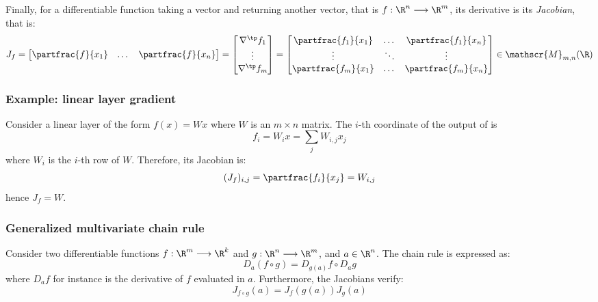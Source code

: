Finally, for a differentiable function taking a vector and returning another vector, that is $f:\R^n\longrightarrow\R^m$, its derivative is its \emph{Jacobian}, that is:
\begin{equation*}
    J_f 
    = \begin{bmatrix} \partfrac{f}{x_1} & \dots & \partfrac{f}{x_n}\end{bmatrix} 
    = \begin{bmatrix} 
        \nabla^\tp f_1\\ 
        \vdots\\ 
        \nabla^\tp f_m
    \end{bmatrix}
    = \begin{bmatrix}
        \partfrac{f_1}{x_1} & \dots & \partfrac{f_1}{x_n}\\
        \vdots & \ddots & \vdots\\
        \partfrac{f_m}{x_1} & \dots & \partfrac{f_m}{x_n}
    \end{bmatrix}
    \in\mathscr{M}_{m, n}(\R)
\end{equation*}

\subsubsection{Example: linear layer gradient}
Consider a linear layer of the form $f(x)=Wx$ where $W$ is an $m\times n$ matrix. The $i$-th coordinate of the output of is
\begin{equation*}
    f_i = W_ix=\sum_j W_{i,j}x_j
\end{equation*}
where $W_i$ is the $i$-th row of $W$. Therefore, its Jacobian is:
\begin{equation*}
    (J_f)_{i, j} = \partfrac{f_i}{x_j} = W_{i, j}
\end{equation*}
hence $J_f=W$.

\subsubsection{Generalized multivariate chain rule}
Consider two differentiable functions $f:\R^m\longrightarrow\R^k$ and $g:\R^n\longrightarrow\R^m$, and $a\in\R^n$. The chain rule is expressed as:
\begin{equation}
    D_a(f\circ g) = D_{g(a)}f\circ D_ag
\end{equation}
where $D_af$ for instance is the derivative of $f$ evaluated in $a$. Furthermore, the Jacobians verify:
\begin{equation}
    J_{f\circ g}(a)=J_f(g(a)) J_g(a)
\end{equation}